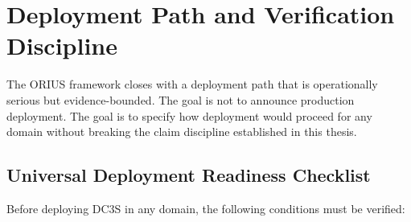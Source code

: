 \chapter{Deployment Path and Verification Discipline}
\label{ch:deployment-path-verification}

The ORIUS framework closes with a deployment path that is operationally
serious but evidence-bounded.  The goal is not to announce production
deployment.  The goal is to specify how deployment would proceed for any
domain without breaking the claim discipline established in this thesis.

\section{Universal Deployment Readiness Checklist}

Before deploying DC3S in any domain, the following conditions must be
verified:

